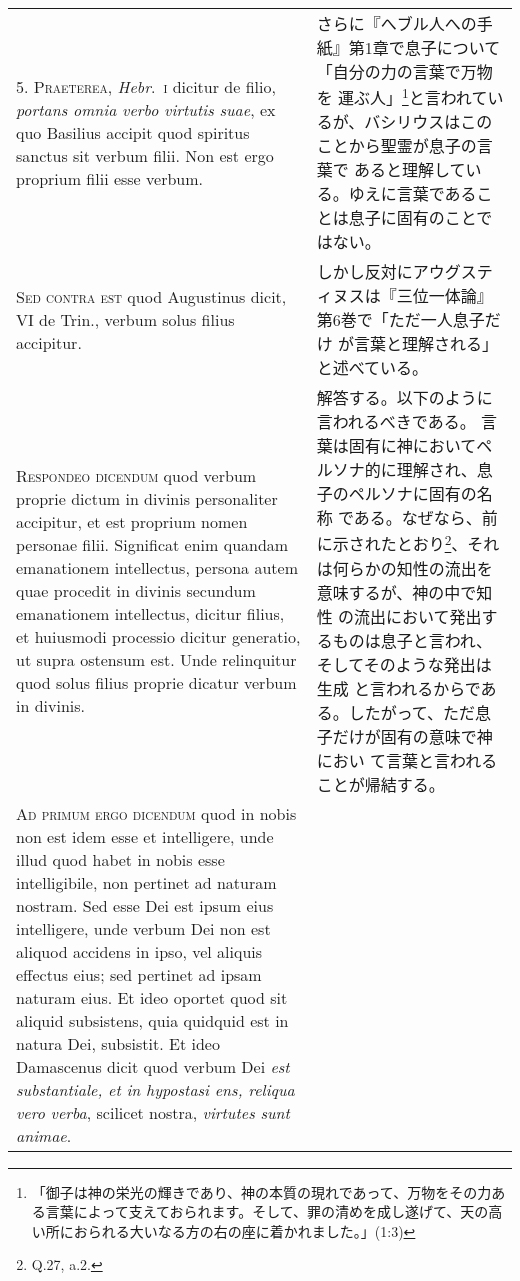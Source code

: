 \documentclass[10pt]{jsarticle} %
\begin{document}
\begin{longtable}{p{21em}p{21em}}
\\



5. {\scshape Praeterea}, {\itshape Hebr}.~{\scshape i} dicitur de filio, {\itshape portans omnia verbo virtutis
suae}, ex quo Basilius accipit quod spiritus sanctus sit verbum
filii. Non est ergo proprium filii esse verbum.

&

さらに『へブル人への手紙』第1章で息子について「自分の力の言葉で万物を
 運ぶ人」\footnote{「御子は神の栄光の輝きであり、神の本質の現れであって、万物をその力ある言葉によって支えておられます。そして、罪の清めを成し遂げて、天の高い所におられる大いなる方の右の座に着かれました。」(1:3)}と言われているが、バシリウスはこのことから聖霊が息子の言葉で
 あると理解している。ゆえに言葉であることは息子に固有のことではない。


\\



{\scshape Sed contra est} quod Augustinus dicit, VI de Trin., verbum solus filius
accipitur.

&

しかし反対にアウグスティヌスは『三位一体論』第6巻で「ただ一人息子だけ
 が言葉と理解される」と述べている。

\\



{\scshape Respondeo dicendum} quod verbum proprie dictum in divinis personaliter
accipitur, et est proprium nomen personae filii. Significat enim
quandam emanationem intellectus, persona autem quae procedit in
divinis secundum emanationem intellectus, dicitur filius, et huiusmodi
processio dicitur generatio, ut supra ostensum est. Unde relinquitur
quod solus filius proprie dicatur verbum in divinis.

&

解答する。以下のように言われるべきである。
言葉は固有に神においてペルソナ的に理解され、息子のペルソナに固有の名称
 である。なぜなら、前に示されたとおり\footnote{Q.27, a.2.}、それは何らかの知性の流出を意味するが、神の中で知性
 の流出において発出するものは息子と言われ、そしてそのような発出は生成
 と言われるからである。したがって、ただ息子だけが固有の意味で神におい
 て言葉と言われることが帰結する。

\\



{\scshape Ad primum ergo dicendum} quod in nobis non est idem esse et
intelligere, unde illud quod habet in nobis esse intelligibile, non
pertinet ad naturam nostram. Sed esse Dei est ipsum eius intelligere,
unde verbum Dei non est aliquod accidens in ipso, vel aliquis effectus
eius; sed pertinet ad ipsam naturam eius. Et ideo oportet quod sit
aliquid subsistens, quia quidquid est in natura Dei, subsistit. Et
ideo Damascenus dicit quod verbum Dei {\itshape est substantiale, et in
hypostasi ens, reliqua vero verba}, scilicet nostra, {\itshape virtutes sunt
animae}.


\end{longtable}
\end{document}
